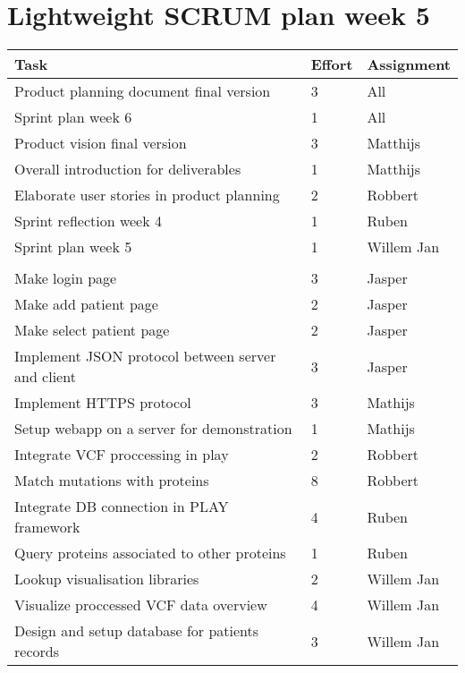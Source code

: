\documentclass[a4paper]{report}
\begin{document}


\section*{Lightweight SCRUM plan week 5}

\setlength\extrarowheight{5pt}
\begin{table}[ht]
\begin{tabular}{p{8cm}|p{2cm}|p{3cm}}

\textbf{Task} & \textbf{Effort} & \textbf{Assignment}\\
\hline \hline

Product planning document final version & 3 & All\\
Sprint plan week 6 & 1 & All\\
Product vision final version & 3 & Matthijs\\
Overall introduction for deliverables & 1 & Matthijs\\
Elaborate user stories in product planning & 2 & Robbert\\
Sprint reflection week 4 & 1 & Ruben\\
Sprint plan week 5 & 1 & Willem Jan\\

\vspace{10pt} & \vspace{10pt} & \vspace{10pt}\\

Make login page & 3 & Jasper\\
Make add patient page & 2 & Jasper\\
Make select patient page & 2 & Jasper\\
Implement JSON protocol between server and client & 3 & Jasper\\
Implement HTTPS protocol & 3 & Mathijs\\
Setup webapp on a server for demonstration & 1 & Mathijs\\
Integrate VCF proccessing in play & 2 & Robbert\\
Match mutations with proteins & 8 & Robbert\\
Integrate DB connection in PLAY framework & 4 & Ruben\\
Query proteins associated to other proteins & 1 & Ruben\\
Lookup visualisation libraries & 2 & Willem Jan\\
Visualize proccessed VCF data overview & 4 & Willem Jan\\
Design and setup database for patients records & 3 & Willem Jan\\
\end{tabular}
\end{table}
\end{document}
